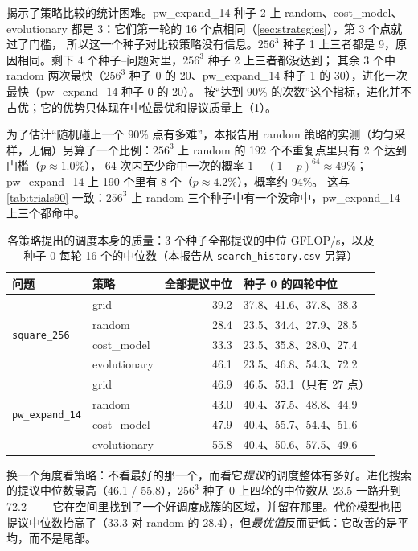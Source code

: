\documentclass[11pt,a4paper]{ctexart}
\newcommand{\sk}[1]{\texttt{#1}}
\begin{document}
 揭示了策略比较的统计困难。pw\_expand\_14 种子 2 上 random、cost\_model、evolutionary 都是 3：它们第一轮的 16 个点相同（\cref{sec:strategies}），第 3 个点就过了门槛，
所以这一个种子对比较策略没有信息。$256^3$ 种子 1 上三者都是 9，原因相同。剩下 4 个种子--问题对里，$256^3$ 种子 2 上三者都没达到；
其余 3 个中 random 两次最快（$256^3$ 种子 0 的 20、pw\_expand\_14 种子 1 的 30），进化一次最快（pw\_expand\_14 种子 0 的 20）。
按“达到 90\% 的次数”这个指标，进化并不占优；它的优势只体现在中位最优和提议质量上（\cref{tab:proposals}）。

为了估计“随机碰上一个 90\% 点有多难”，本报告用 random 策略的实测（均匀采样，无偏）另算了一个比例：$256^3$ 上 random 的 192 个不重复点里只有 2 个达到门槛（$p\approx1.0\%$），
64 次内至少命中一次的概率 $1-(1-p)^{64}\approx49\%$；pw\_expand\_14 上 190 个里有 8 个（$p\approx4.2\%$），概率约 94\%。
这与\cref{tab:trials90} 一致：$256^3$ 上 random 三个种子中有一个没命中，pw\_expand\_14 上三个都命中。

\begin{table}[H]
\centering\small
\caption{各策略提出的调度本身的质量：3 个种子全部提议的中位 GFLOP/s，以及种子 0 每轮 16 个的中位数（本报告从 \texttt{search\_history.csv} 另算）}\label{tab:proposals}
\begin{tabular}{llrl}
\toprule
问题 & 策略 & 全部提议中位 & 种子 0 的四轮中位 \\
\midrule
\multirow{4}{*}{\sk{square\_256}} & grid & 39.2 & 37.8、41.6、37.8、38.3 \\
 & random & 28.4 & 23.5、34.4、27.9、28.5 \\
 & cost\_model & 33.3 & 23.5、35.8、28.0、27.4 \\
 & evolutionary & 46.1 & 23.5、46.8、54.3、72.2 \\
\midrule
\multirow{4}{*}{\sk{pw\_expand\_14}} & grid & 46.9 & 46.5、53.1（只有 27 点） \\
 & random & 43.0 & 40.4、37.5、48.8、44.9 \\
 & cost\_model & 47.9 & 40.4、55.7、54.4、51.6 \\
 & evolutionary & 55.8 & 40.4、50.6、57.5、49.6 \\
\bottomrule
\end{tabular}
\end{table}

 换一个角度看策略：不看最好的那一个，而看它\emph{提议}的调度整体有多好。进化搜索的提议中位数最高（46.1 / 55.8），$256^3$ 种子 0 上四轮的中位数从 23.5 一路升到 72.2——
它在空间里找到了一个好调度成簇的区域，并留在那里。代价模型也把提议中位数抬高了（33.3 对 random 的 28.4），但\emph{最优值}反而更低：它改善的是平均，而不是尾部。
\end{document}
